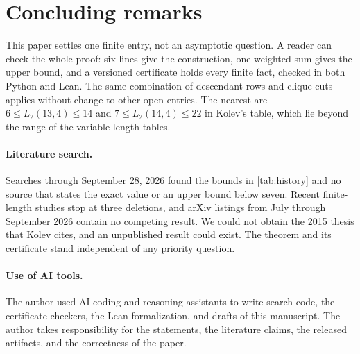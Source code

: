 \documentclass[11pt]{article}
\theoremstyle{definition}
\begin{document}
\section{Concluding remarks}

This paper settles one finite entry, not an asymptotic question.  A reader can
check the whole proof: six lines give the construction, one weighted sum gives
the upper bound, and a versioned certificate holds every finite fact, checked
in both Python and Lean.  The same combination of descendant rows and clique
cuts applies without change to other open entries.  The nearest are
$6\leq L_2(13,4)\leq14$ and $7\leq L_2(14,4)\leq22$ in Kolev's table, which
lie beyond the range of the variable-length tables.

\paragraph{Literature search.}
Searches through September 28, 2026 found the bounds in
\cref{tab:history} and no source that states the exact value or an upper bound
below seven.  Recent finite-length studies stop at three deletions, and
arXiv listings from July through September 2026 contain no competing
result.  We could not obtain the 2015 thesis that Kolev cites,
and an unpublished result could exist.  The theorem and its certificate stand
independent of any priority question.

\paragraph{Use of AI tools.}
The author used AI coding and reasoning assistants to write search code, the
certificate checkers, the Lean formalization, and drafts of this manuscript.
The author takes responsibility for the statements, the literature claims, the
released artifacts, and the correctness of the paper.



\end{document}

